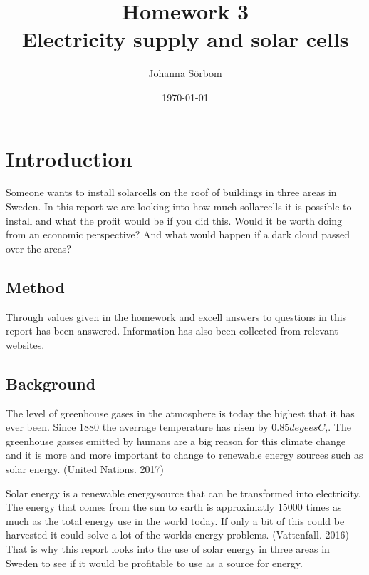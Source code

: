 \documentclass{report}
\title{Homework 3\\ Electricity supply and solar cells}
\date{\today}
\author{Johanna Sörbom}
\begin{document}
\maketitle
\chapter*{Introduction}
Someone wants to install solarcells on the roof of buildings in three areas in Sweden. In this report we are looking into how much sollarcells it is possible to install and what the profit would be if you did this. Would it be worth doing from an economic perspective? And what would happen if a dark cloud passed over the areas?

\section*{Method}
Through values given in the homework and excell answers to questions in this report has been answered. Information  has also been collected from relevant websites. 

\section*{Background}
The level of greenhouse gases in the atmosphere is today the highest that it has ever been. Since 1880 the averrage temperature has risen by $ 0.85 degees C $,. The greenhouse gasses emitted by humans are a big reason for this climate change and it is more and more important to change to renewable energy sources such as solar energy. (United Nations. 2017)

Solar energy is a renewable energysource that can be transformed into electricity. The energy that comes from the sun to earth is approximatly $ 15000 $ times as much as the total energy use in the world today. If only a bit of this could be harvested it could solve a lot of the worlds energy problems. (Vattenfall. 2016) That is why this report looks into the use of solar energy in three areas in Sweden to see if it would be profitable to use as a source for energy. 
\end{document}
